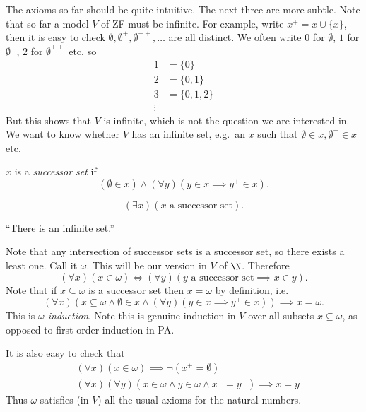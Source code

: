\documentclass[a4paper]{article}
\begin{document}
The axioms so far should be quite intuitive. The next three are more subtle. Note that so far a model \(V\) of ZF must be infinite. For example, write \(x^+ = x \cup \{x\}\), then it is easy to check \(\emptyset, \emptyset^+, \emptyset^{++}, \dots\) are all distinct. We often write \(0\) for \(\emptyset\), \(1\) for \(\emptyset^+\), \(2\) for \(\emptyset^{++}\) etc, so
\begin{align*}
  1 &= \{0\} \\
  2 &= \{0, 1\} \\
  3 &= \{0, 1, 2\} \\
  \vdots
\end{align*}
But this shows that \(V\) is infinite, which is not the question we are interested in. We want to know whether \(V \) has an infinite set, e.g.\ an \(x\) such that \(\emptyset \in x, \emptyset^+ \in x\) etc.

\begin{definition}
  \(x\) is a \emph{successor set} if
  \[
    (\emptyset \in x) \land (\forall y) (y \in x \implies y^+ \in x).
  \]
\end{definition}

\begin{axiom*}
  \[
    (\exists x) (x \text{ a successor set}).
  \]
\end{axiom*}
``There is an infinite set.''

Note that any intersection of successor sets is a successor set, so there exists a least one. Call it \(\omega\). This will be our version in \(V\) of \(\N\). Therefore
\[
  (\forall x) (x \in \omega) \iff (\forall y) (y \text{ a successor set} \implies x \in y).
\]
Note that if \(x \subseteq \omega\) is a successor set then \(x = \omega\) by definition, i.e.
\[
  (\forall x) (x \subseteq \omega \land \emptyset \in x \land (\forall y) (y \in x \implies y^+ \in x)) \implies x = \omega.
\]
This is \emph{\(\omega\)-induction}. Note this is genuine induction in \(V\) over all subsets \(x \subseteq \omega\), as opposed to first order induction in PA.

It is also easy to check that
\begin{align*}
  & (\forall x) (x \in \omega) \implies \neg (x^+ = \emptyset) \\
  & (\forall x) (\forall y) (x \in \omega \land y \in \omega \land x^+ = y^+) \implies x = y
\end{align*}
Thus \(\omega\) satisfies (in \(V\)) all the usual axioms for the natural numbers.
\end{document}
